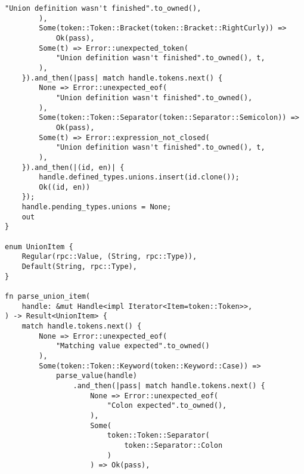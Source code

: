 \clearpage
\begin{lstlisting}[caption={Разбор объединения (часть 3)}, label={lst:rust_parser_union3}]
            "Union definition wasn't finished".to_owned(),
        ),
        Some(token::Token::Bracket(token::Bracket::RightCurly)) =>
            Ok(pass),
        Some(t) => Error::unexpected_token(
            "Union definition wasn't finished".to_owned(), t,
        ),
    }).and_then(|pass| match handle.tokens.next() {
        None => Error::unexpected_eof(
            "Union definition wasn't finished".to_owned(),
        ),
        Some(token::Token::Separator(token::Separator::Semicolon)) =>
            Ok(pass),
        Some(t) => Error::expression_not_closed(
            "Union definition wasn't finished".to_owned(), t,
        ),
    }).and_then(|(id, en)| {
        handle.defined_types.unions.insert(id.clone());
        Ok((id, en))
    });
    handle.pending_types.unions = None;
    out
}

enum UnionItem {
    Regular(rpc::Value, (String, rpc::Type)),
    Default(String, rpc::Type),
}

fn parse_union_item(
    handle: &mut Handle<impl Iterator<Item=token::Token>>,
) -> Result<UnionItem> {
    match handle.tokens.next() {
        None => Error::unexpected_eof(
            "Matching value expected".to_owned()
        ),
        Some(token::Token::Keyword(token::Keyword::Case)) =>
            parse_value(handle)
                .and_then(|pass| match handle.tokens.next() {
                    None => Error::unexpected_eof(
                        "Colon expected".to_owned(),
                    ),
                    Some(
                        token::Token::Separator(
                            token::Separator::Colon
                        )
                    ) => Ok(pass),
\end{lstlisting}
\clearpage
